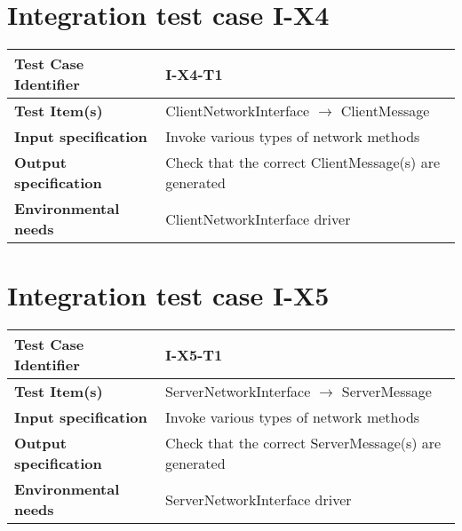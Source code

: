 
\section{Integration test case I-X4}
\begin{tabular*}{1.23\textwidth}{ l l }
 \textbf{Test Case Identifier}		& I-X4-T1 \\
 \hline
 \textbf{Test Item(s)}			& ClientNetworkInterface $\rightarrow$ ClientMessage \\
 \hline
 \textbf{Input specification}		& Invoke various types of network methods \\
 \hline
 \textbf{Output specification}		& Check that the correct ClientMessage(s) are generated \\
 \hline
 \textbf{Environmental needs}		& ClientNetworkInterface driver \\
\end{tabular*}

\section{Integration test case I-X5}
\begin{tabular*}{1.23\textwidth}{ l l }
 \textbf{Test Case Identifier}		& I-X5-T1 \\
 \hline
 \textbf{Test Item(s)}			& ServerNetworkInterface $\rightarrow$ ServerMessage \\
 \hline
 \textbf{Input specification}		& Invoke various types of network methods \\
 \hline
 \textbf{Output specification}		& Check that the correct ServerMessage(s) are generated \\
 \hline
 \textbf{Environmental needs}		& ServerNetworkInterface driver \\
\end{tabular*}

